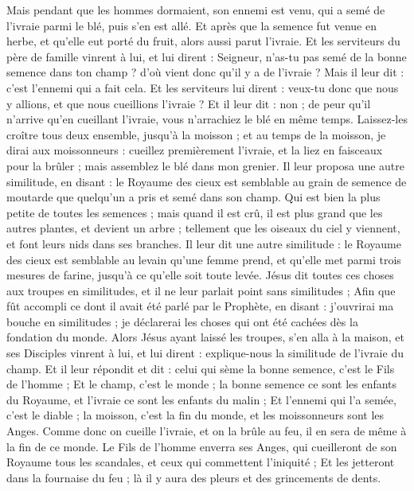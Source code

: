 \begin{multicols}{2}
Mais pendant que les hommes dormaient, son ennemi est venu, qui a semé de l'ivraie parmi le blé, puis s'en est allé.
Et après que la semence fut venue en herbe, et qu'elle eut porté du fruit, alors aussi parut l'ivraie.
Et les serviteurs du père de famille vinrent à lui, et lui dirent : Seigneur, n'as-tu pas semé de la bonne semence dans ton champ ? d'où vient donc qu'il y a de l'ivraie ?
Mais il leur dit : c'est l'ennemi qui a fait cela. Et les serviteurs lui dirent : veux-tu donc que nous y allions, et que nous cueillions l'ivraie ?
Et il leur dit : non ; de peur qu'il n'arrive qu'en cueillant l'ivraie, vous n'arrachiez le blé en même temps.
Laissez-les croître tous deux ensemble, jusqu'à la moisson ; et au temps de la moisson, je dirai aux moissonneurs : cueillez premièrement l'ivraie, et la liez en faisceaux pour la brûler ; mais assemblez le blé dans mon grenier.
Il leur proposa une autre similitude, en disant : le Royaume des cieux est semblable au grain de semence de moutarde que quelqu'un a pris et semé dans son champ.
Qui est bien la plus petite de toutes les semences ; mais quand il est crû, il est plus grand que les autres plantes, et devient un arbre ; tellement que les oiseaux du ciel y viennent, et font leurs nids dans ses branches.
Il leur dit une autre similitude : le Royaume des cieux est semblable au levain qu'une femme prend, et qu'elle met parmi trois mesures de farine, jusqu'à ce qu'elle soit toute levée.
Jésus dit toutes ces choses aux troupes en similitudes, et il ne leur parlait point sans similitudes ;
Afin que fût accompli ce dont il avait été parlé par le Prophète, en disant : j'ouvrirai ma bouche en similitudes ; je déclarerai les choses qui ont été cachées dès la fondation du monde.
Alors Jésus ayant laissé les troupes, s'en alla à la maison, et ses Disciples vinrent à lui, et lui dirent : explique-nous la similitude de l'ivraie du champ.
Et il leur répondit et dit : celui qui sème la bonne semence, c'est le Fils de l'homme ;
Et le champ, c'est le monde ; la bonne semence ce sont les enfants du Royaume, et l'ivraie ce sont les enfants du malin ;
Et l'ennemi qui l'a semée, c'est le diable ; la moisson, c'est la fin du monde, et les moissonneurs sont les Anges.
Comme donc on cueille l'ivraie, et on la brûle au feu, il en sera de même à la fin de ce monde.
Le Fils de l'homme enverra ses Anges, qui cueilleront de son Royaume tous les scandales, et ceux qui commettent l'iniquité ;
Et les jetteront dans la fournaise du feu ; là il y aura des pleurs et des grincements de dents.

\end{multicols}
